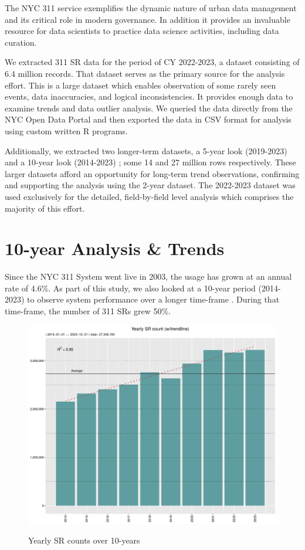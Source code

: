 \documentclass[12pt, titlepage]{article}
\begin{document}
The NYC 311 service exemplifies the dynamic nature of urban data
management and its critical role in modern governance. In addition it provides an
invaluable resource for data scientists to practice data science activities, including data curation.

We extracted 311 SR data for the period of CY 2022-2023, a dataset consisting of
6.4 million records. That dataset serves as the primary source for the analysis effort. This is a large dataset which enables 
observation of some rarely seen events, data inaccuracies, and logical inconsistencies. It provides enough data to examine trends and data outlier analysis. 
We queried the data directly from the NYC Open Data Portal and then exported the data in CSV format for analysis using custom written R programs.

Additionally, we extracted two longer-term datasets, a 5-year look (2019-2023) and a 10-year look (2014-2023) ; some 14 and 27 million rows respectively. 
These larger datasets afford an opportunity for long-term trend observations, confirming and supporting the analysis using the 2-year dataset. The 2022-2023 dataset
was used exclusively for the detailed, field-by-field level analysis which comprises the majority of this effort. 



\section{10-year Analysis \& Trends} \label{sec:trends}

Since the NYC 311 System went live in 2003, the usage has grown at an annual
rate of 4.6\%. As part of this study, we also looked at a 10-year period (2014-2023) to
observe system performance over a longer time-frame . During that time-frame, 
the number of 311 SRs grew 50\%.

\begin{figure}[tbp]
  \centering
  \caption{Yearly SR counts over 10-years}
  \includegraphics[width=\textwidth]{Yearly.pdf}
  \label{fig:yearly-counts}
\end{figure}
\end{document}
